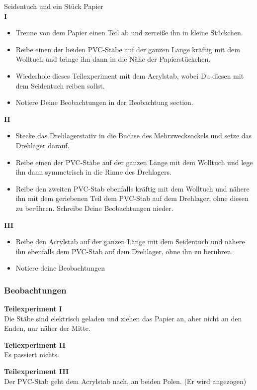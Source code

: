 \documentclass[a4paper]{report}
\begin{document}
Seidentuch und ein Stück Papier\\ \textbf{I}\\ \begin{itemize} \item Trenne von
  dem Papier einen Teil ab und zerreiße ihn in kleine Stückchen. \item Reibe
  einen der beiden PVC-Stäbe auf der ganzen Länge kräftig mit dem Wolltuch und
  bringe ihn dann in die Nähe der Papierstückchen. \item Wiederhole dieses
Teilexperiment mit dem Acrylstab, wobei Du diesen mit dem Seidentuch reiben
sollst. \item Notiere Deine Beobachtungen in der Beobachtung section.
\end{itemize} \textbf{II}\\ \begin{itemize} \item Stecke das Drehlagerstativ in
die Buchse des Mehrzwecksockels und setze das Drehlager darauf. \item Reibe
einen der PVC-Stäbe auf der ganzen Länge mit dem Wolltuch und lege ihn dann
symmetrisch in die Rinne des Drehlagers. \item Reibe den zweiten PVC-Stab
ebenfalls kräftig mit dem Wolltuch und nähere ihn mit dem geriebenen Teil dem
PVC-Stab auf dem Drehlager, ohne diesen zu berühren. Schreibe Deine
Beobachtungen nieder.\\ \end{itemize} \noindent\textbf{III}\\ \begin{itemize}
\item Reibe den Acrylstab auf der ganzen Länge mit dem Seidentuch und nähere
  ihn ebenfalls dem PVC-Stab auf dem Drehlager, ohne ihn zu berühren. \item
  Notiere deine Beobachtungen \end{itemize}

  \subsubsection{Beobachtungen} \textbf{Teilexperiment I}\\ Die Stäbe sind
  elektrisch geladen und ziehen das Papier an, aber nicht an den Enden, nur
  näher der Mitte.

\noindent\textbf{Teilexperiment II}\\
Es passiert nichts.


\noindent\textbf{Teilexperiment III}\\ Der PVC-Stab geht dem Acrylstab nach, an
beiden Polen. (Er wird angezogen)
\end{document}
